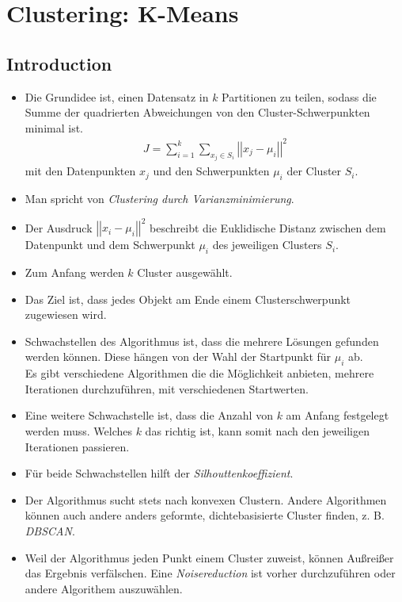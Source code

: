 \section{Clustering: K-Means}

\subsection{Introduction}
\begin{itemize}
	\item Die Grundidee ist, einen Datensatz in $k$ Partitionen zu teilen, sodass die Summe der quadrierten Abweichungen von den Cluster-Schwerpunkten minimal ist.
	\begin{align}
		J = \sum_{i=1}^{k}\sum_{x_j\in S_i} \left| \left| x_j - \mu_i \right| \right|^2  
	\end{align}
	mit den Datenpunkten $x_j$ und den Schwerpunkten $\mu_i$ der Cluster $S_i$.
	\item Man spricht von \textit{Clustering durch Varianzminimierung}.
	\item Der Ausdruck $\left| \left| x_i -\mu_i \right| \right|^2$ beschreibt die Euklidische Distanz zwischen dem Datenpunkt und dem Schwerpunkt $\mu_i$ des jeweiligen Clusters $S_i$.
	\item Zum Anfang werden $k$ Cluster ausgewählt.
	\item Das Ziel ist, dass jedes Objekt am Ende einem Clusterschwerpunkt zugewiesen wird.
	\item Schwachstellen des Algorithmus ist, dass die mehrere Lösungen gefunden werden können. Diese hängen von der Wahl der Startpunkt für $\mu_i$ ab. \\
	
	Es gibt verschiedene Algorithmen die die Möglichkeit anbieten, mehrere Iterationen durchzuführen, mit verschiedenen Startwerten.
	\item Eine weitere Schwachstelle ist, dass die Anzahl von $k$ am Anfang festgelegt werden muss. Welches $k$ das richtig ist, kann somit nach den jeweiligen Iterationen passieren.
	\item Für beide Schwachstellen hilft der \textit{Silhouttenkoeffizient}.
	\item Der Algorithmus sucht stets nach konvexen Clustern. Andere Algorithmen können auch andere anders geformte, dichtebasisierte Cluster finden, z. B. \textit{DBSCAN}.
	\item Weil der Algorithmus jeden Punkt einem Cluster zuweist, können Außreißer das Ergebnis verfälschen. Eine \textit{Noisereduction} ist vorher durchzuführen oder andere Algorithem auszuwählen.
\end{itemize}

